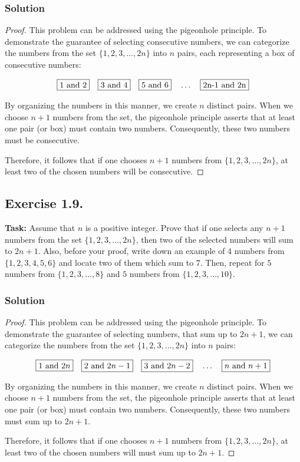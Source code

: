 \documentclass{article}
\begin{document}
\subsubsection*{Solution}

\begin{proof}
    This problem can be addressed using the pigeonhole principle. To demonstrate the guarantee of selecting consecutive numbers, we can categorize the numbers from the set $\{1, 2, 3, \ldots, 2n\}$ into $n$ pairs, each representing a box of consecutive numbers:

    \[
    \fbox{1 and 2} \quad \fbox{3 and 4} \quad \fbox{5 and 6} \quad \dots \quad \fbox{2n-1 and 2n}
    \]

    By organizing the numbers in this manner, we create $n$ distinct pairs. When we choose $n + 1$ numbers from the set, the pigeonhole principle asserts that at least one pair (or box) must contain two numbers. Consequently, these two numbers must be consecutive.

    Therefore, it follows that if one chooses $n + 1$ numbers from $\{1, 2, 3, \ldots, 2n\}$, at least two of the chosen numbers will be consecutive.
\end{proof}

\subsection{Exercise 1.9.}
\textbf{Task:} Assume that $n$ is a positive integer. Prove that if one selects any $n + 1$ numbers from the set $\{1,2,3,\dots,2n\}$, then two of the selected numbers will sum to $2n+1$. Also, before your proof, write down an example of $4$ numbers from $\{1,2,3,4,5,6\}$ and locate two of them which sum to 7. Then, repeat for $5$ numbers from $\{1,2,3,\dots,8\}$ and $5$ numbers from $\{1,2,3,\dots,10\}$.

\subsubsection*{Solution}

\begin{proof}
    This problem can be addressed using the pigeonhole principle. To demonstrate the guarantee of selecting numbers, that sum up to $2n + 1$, we can categorize the numbers from the set $\{1, 2, 3, \ldots, 2n\}$ into $n$ pairs:

    \[
    \fbox{$1$ and $2n$} \quad \fbox{$2$ and $2n-1$} \quad \fbox{$3$ and $2n-2$} \quad \dots \quad \fbox{$n$ and $n+1$}
    \]

    By organizing the numbers in this manner, we create $n$ distinct pairs. When we choose $n + 1$ numbers from the set, the pigeonhole principle asserts that at least one pair (or box) must contain two numbers. Consequently, these two numbers must sum up to $2n+1$.

    Therefore, it follows that if one chooses $n + 1$ numbers from $\{1, 2, 3, \ldots, 2n\}$, at least two of the chosen numbers will must sum up to $2n+1$.
\end{proof}
\end{document}

